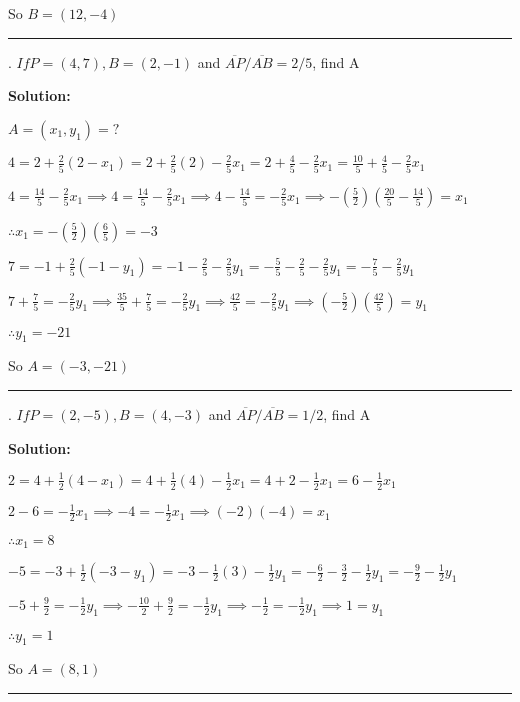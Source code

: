 \documentclass[10pt,letterpaper]{article}
\begin{document}
\medskip
So $B = (12, -4)$

\noindent\rule{15cm}{0.4pt}

. $If P=(4,7), B=(2,-1)$ and $\overline{AP}/\overline{AB}=2/5$, find A

\medskip
{} {\textbf{{\color{blue}Solution}:}}

\medskip
$A=(x_1,y_1)=?$

\medskip
$4 = 2+\frac{2}{5}(2-x_1)=2+\frac{2}{5}(2)-\frac{2}{5}x_1=2+\frac{4}{5}-\frac{2}{5}x_1=\frac{10}{5}+\frac{4}{5}-\frac{2}{5}x_1$

\medskip
$4=\frac{14}{5}-\frac{2}{5}x_1 \implies 4=\frac{14}{5}-\frac{2}{5}x_1 \implies 4-\frac{14}{5}=-\frac{2}{5}x_1 \implies -(\frac{5}{2})(\frac{20}{5}-\frac{14}{5})=x_1$

\medskip
$\therefore x_1=-(\frac{5}{2})(\frac{6}{5})=-3$

\medskip
$7=-1+\frac{2}{5}(-1-y_1)=-1-\frac{2}{5}-\frac{2}{5}y_1=-\frac{5}{5}-\frac{2}{5}-\frac{2}{5}y_1=-\frac{7}{5}-\frac{2}{5}y_1$

\medskip
$7+\frac{7}{5}=-\frac{2}{5}y_1 \implies \frac{35}{5}+\frac{7}{5}=-\frac{2}{5}y_1 \implies \frac{42}{5}=-\frac{2}{5}y_1 \implies (-\frac{5}{2})(\frac{42}{5})=y_1$

\medskip
$\therefore y_1=-21$

\medskip
So $A=(-3,-21)$

\noindent\rule{15cm}{0.4pt}

. $If P=(2,-5), B=(4,-3)$ and $\overline{AP}/\overline{AB}=1/2$, find A

\medskip
{} {\textbf{{\color{blue}Solution}:}}

\medskip
$2=4+\frac{1}{2}(4-x_1)=4+\frac{1}{2}(4)-\frac{1}{2}x_1=4+2-\frac{1}{2}x_1=6-\frac{1}{2}x_1$

\medskip
$2-6=-\frac{1}{2}x_1 \implies -4=-\frac{1}{2}x_1 \implies (-2)(-4)=x_1$

\medskip
$\therefore x_1=8$

\medskip
$-5=-3+\frac{1}{2}(-3-y_1)=-3-\frac{1}{2}(3)-\frac{1}{2}y_1=-\frac{6}{2}-\frac{3}{2}-\frac{1}{2}y_1=-\frac{9}{2}-\frac{1}{2}y_1$

\medskip
$-5+\frac{9}{2}=-\frac{1}{2}y_1 \implies -\frac{10}{2}+\frac{9}{2}=-\frac{1}{2}y_1 \implies -\frac{1}{2}=-\frac{1}{2}y_1 \implies 1=y_1$

\medskip
$\therefore y_1=1$

\medskip
So $A=(8,1)$

\noindent\rule{15cm}{0.4pt}
\end{document}
